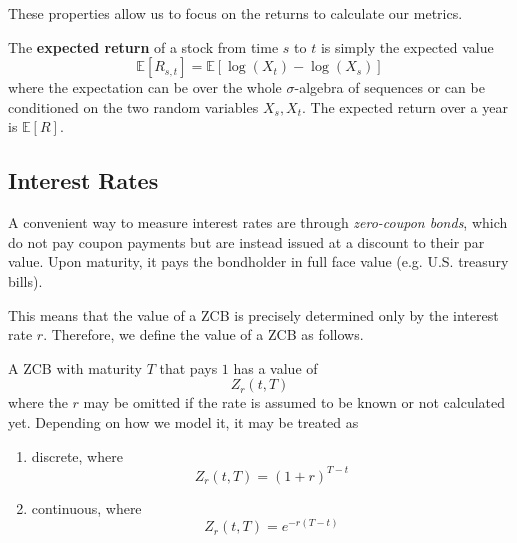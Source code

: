 \documentclass{article}
\begin{document}
    These properties allow us to focus on the returns to calculate our metrics. 

    \begin{definition}
      \label{def:expected-return}
      The \textbf{expected return} of a stock from time $s$ to $t$ is simply the expected value 
      \begin{equation}
        \mathbb{E}[R_{s, t}] = \mathbb{E} [ \log(X_t) - \log(X_s) ]
      \end{equation}
      where the expectation can be over the whole $\sigma$-algebra of sequences or can be conditioned on the two random variables $X_s, X_t$. The expected return over a year is $\mathbb{E}[R]$. 
    \end{definition}
  
  \subsection{Interest Rates}

    \begin{definition}
      \label{def:zero-coupon-bonds}
      A convenient way to measure interest rates are through \textit{zero-coupon bonds}, which do not pay coupon payments but are instead issued at a discount to their par value. Upon maturity, it pays the bondholder in full face value (e.g. U.S. treasury bills). 
    \end{definition}

    This means that the value of a ZCB is precisely determined only by the interest rate $r$. Therefore, we define the value of a ZCB as follows. 

    \begin{definition}[ZCB]
      \label{def:zcb}
      A ZCB with maturity $T$ that pays $1$ has a value of 
      \begin{equation}
        Z_r (t, T) 
      \end{equation}
      where the $r$ may be omitted if the rate is assumed to be known or not calculated yet. Depending on how we model it, it may be treated as 
      \begin{enumerate}
        \item discrete, where 
          \begin{equation}
            Z_r (t, T) = (1 + r)^{T - t}
          \end{equation}
        \item continuous, where 
          \begin{equation}
            Z_r (t, T) = e^{- r (T - t)}
          \end{equation}
      \end{enumerate}
    \end{definition}
\end{document}
